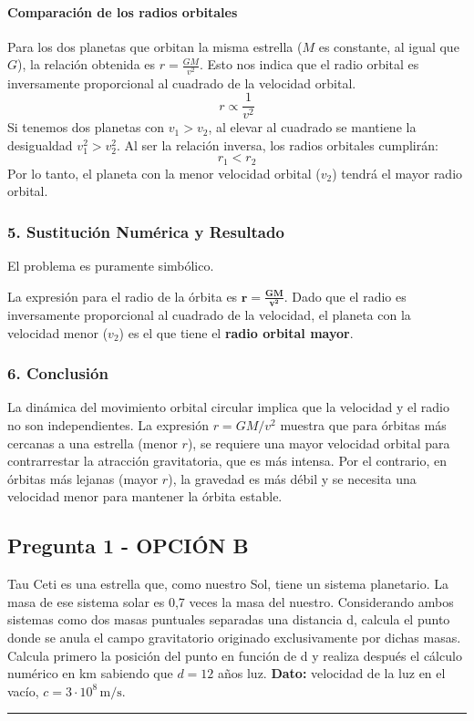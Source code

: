 \paragraph*{Comparación de los radios orbitales}
Para los dos planetas que orbitan la misma estrella ($M$ es constante, al igual que $G$), la relación obtenida es $r = \frac{GM}{v^2}$. Esto nos indica que el radio orbital es inversamente proporcional al cuadrado de la velocidad orbital.
$$ r \propto \frac{1}{v^2} $$
Si tenemos dos planetas con $v_1 > v_2$, al elevar al cuadrado se mantiene la desigualdad $v_1^2 > v_2^2$. Al ser la relación inversa, los radios orbitales cumplirán:
$$ r_1 < r_2 $$
Por lo tanto, el planeta con la menor velocidad orbital ($v_2$) tendrá el mayor radio orbital.

\subsubsection*{5. Sustitución Numérica y Resultado}
El problema es puramente simbólico.
\begin{cajaresultado}
La expresión para el radio de la órbita es $\boldsymbol{r = \frac{G M}{v^2}}$.
Dado que el radio es inversamente proporcional al cuadrado de la velocidad, el planeta con la velocidad menor ($v_2$) es el que tiene el \textbf{radio orbital mayor}.
\end{cajaresultado}

\subsubsection*{6. Conclusión}
\begin{cajaconclusion}
La dinámica del movimiento orbital circular implica que la velocidad y el radio no son independientes. La expresión $r=GM/v^2$ muestra que para órbitas más cercanas a una estrella (menor $r$), se requiere una mayor velocidad orbital para contrarrestar la atracción gravitatoria, que es más intensa. Por el contrario, en órbitas más lejanas (mayor $r$), la gravedad es más débil y se necesita una velocidad menor para mantener la órbita estable.
\end{cajaconclusion}

\newpage

\subsection{Pregunta 1 - OPCIÓN B}
\label{subsec:1B_2018_jun_ord}
\begin{cajaenunciado}
Tau Ceti es una estrella que, como nuestro Sol, tiene un sistema planetario. La masa de ese sistema solar es 0,7 veces la masa del nuestro. Considerando ambos sistemas como dos masas puntuales separadas una distancia d, calcula el punto donde se anula el campo gravitatorio originado exclusivamente por dichas masas. Calcula primero la posición del punto en función de d y realiza después el cálculo numérico en km sabiendo que $d=12$ años luz.
\textbf{Dato:} velocidad de la luz en el vacío, $c=3\cdot10^{8}\,\text{m/s}$.
\end{cajaenunciado}
\hrule

